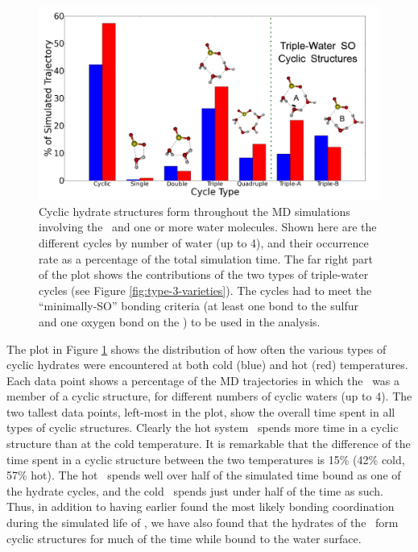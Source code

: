 \begin{figure}[h!]
	\begin{center}
		\includegraphics[scale=1.0]{images/cycles/SO-cycle-breakdown-with-cartoons-small.png}
		\caption{Cyclic hydrate structures form throughout the MD simulations involving the \suldiox~and one or more water molecules. Shown here are the different cycles by number of water (up to 4), and their occurrence rate as a percentage of the total simulation time. The far right part of the plot shows the contributions of the two types of triple-water cycles (see Figure \ref{fig:type-3-varieties}). The cycles had to meet the ``minimally-SO'' bonding criteria (at least one bond to the sulfur and one oxygen bond on the \suldiox) to be used in the analysis.}
		\label{fig:cyclic-breakdown}
	\end{center}
\end{figure}

The plot in Figure \ref{fig:cyclic-breakdown} shows the distribution of how often the various types of cyclic hydrates were encountered at both cold (blue) and hot (red) temperatures. Each data point shows a percentage of the MD trajectories in which the \suldiox~was a member of a cyclic structure, for different numbers of cyclic waters (up to 4). The two tallest data points, left-most in the plot, show the overall time spent in all types of cyclic structures. Clearly the hot system \suldiox~spends more time in a cyclic structure than at the cold temperature. It is remarkable that the difference of the time spent in a cyclic structure between the two temperatures is 15\% (42\% cold, 57\% hot). The hot \suldiox~spends well over half of the simulated time bound as one of the hydrate cycles, and the cold \suldiox~spends just under half of the time as such. Thus, in addition to having earlier found the most likely bonding coordination during the simulated life of \suldiox, we have also found that the hydrates of the \suldiox~form cyclic structures for much of the time while bound to the water surface.

